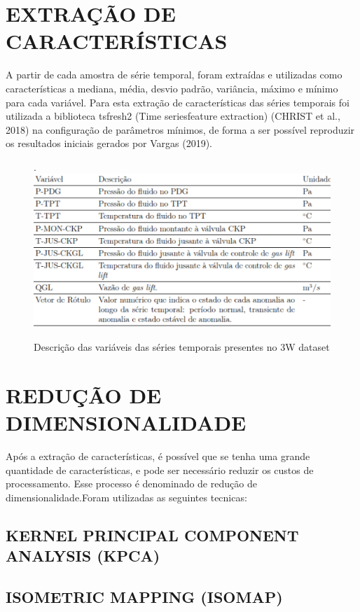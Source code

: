 \section{EXTRAÇÃO DE CARACTERÍSTICAS }
A partir de cada amostra de série temporal, foram extraídas e utilizadas como características a
mediana, média, desvio padrão, variância, máximo e mínimo para cada variável. Para esta
extração de características das séries temporais foi utilizada a biblioteca tsfresh2
(Time seriesfeature extraction) (CHRIST et al., 2018) na configuração de parâmetros mínimos, de forma a
ser possível reproduzir os resultados iniciais gerados por Vargas (2019).

\begin{figure}[H]
    \centering
    \caption{Descrição das variáveis das séries temporais presentes no 3W dataset}. 
    \label{fig:10}
 \includegraphics[width=120mm]{images/fig10.png}
\end{figure}


\section{REDUÇÃO DE DIMENSIONALIDADE}
Após a extração de características, é possível que se tenha uma grande quantidade de
características, e pode ser necessário reduzir os custos de processamento. Esse processo é
denominado de redução de dimensionalidade.Foram utilizadas as seguintes tecnicas:

\subsection{KERNEL PRINCIPAL COMPONENT ANALYSIS (KPCA)}
\subsection{ISOMETRIC MAPPING (ISOMAP)}
